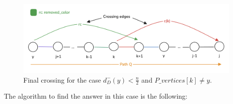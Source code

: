 \begin{figure}[H]
    \centering
    \includegraphics[width=1\textwidth]{figuras/cycle_n-1_last_crossing.png}
    \caption{Final crossing for the case $d^-_D(y) < \frac{n}{2}$ and $P\_vertices[k] \neq y$.}
    \label{fig:cycle_n-1_last_crossing}
\end{figure}

The algorithm to find the answer in this case is the following:

